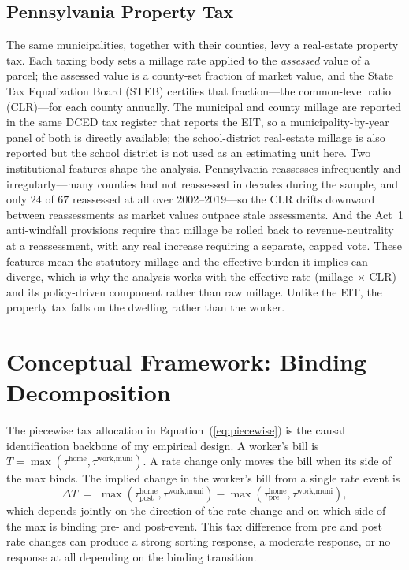 \documentclass[12pt]{article}
\begin{document}
\subsection{Pennsylvania Property Tax}
\label{subsec:proptax-inst}

The same municipalities, together with their counties, levy a real-estate
property tax. Each taxing body sets a millage rate applied to the
\emph{assessed} value of a parcel; the assessed value is a county-set
fraction of market value, and the State Tax Equalization Board (STEB)
certifies that fraction---the common-level ratio (CLR)---for each county
annually. The municipal and county millage are reported in the same DCED
tax register that reports the EIT, so a municipality-by-year panel of
both is directly available; the school-district real-estate millage is
also reported but the school district is not used as an estimating unit
here. Two institutional features shape the analysis. Pennsylvania
reassesses infrequently and irregularly---many counties had not reassessed
in decades during the sample, and only $24$ of $67$ reassessed at all over
2002--2019---so the CLR drifts downward between reassessments as market
values outpace stale assessments. And the Act~1 anti-windfall provisions
require that millage be rolled back to revenue-neutrality at a
reassessment, with any real increase requiring a separate, capped vote.
These features mean the statutory millage and the effective burden it
implies can diverge, which is why the analysis works with the effective
rate (millage $\times$ CLR) and its policy-driven component rather than
raw millage. Unlike the EIT, the property tax falls on the dwelling
rather than the worker.

\section{Conceptual Framework: Binding Decomposition}
\label{sec:theory}

The piecewise tax allocation in Equation~(\ref{eq:piecewise}) is the causal
identification backbone of my empirical design. A worker's bill is
$T = \max(\tau^{\text{home}}, \tau^{\text{work,muni}})$. A rate change
only moves the bill when its side of the max binds. The
implied change in the worker's bill from a single rate event is
\[
  \Delta T \;=\; \max(\tau^{\text{home}}_{\text{post}}, \tau^{\text{work,muni}})
              - \max(\tau^{\text{home}}_{\text{pre}},  \tau^{\text{work,muni}}),
\]
which depends jointly on the direction of the rate change and on
which side of the max is binding pre- and post-event. This tax difference from pre and post rate changes can
produce a strong sorting response, a moderate response, or no
response at all depending on the binding transition.
\end{document}
